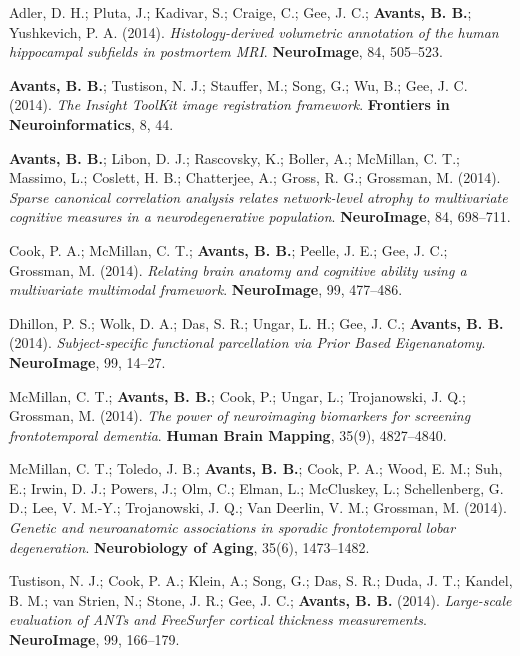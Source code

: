 \documentclass[10pt,letterpaper]{article}
\begin{document}
\begin{enumerate}
{  %
  \item Adler, D. H.; Pluta, J.; Kadivar, S.; Craige, C.; Gee, J. C.; \textbf{Avants, B. B.}; Yushkevich, P. A. (2014). \textit{Histology-derived volumetric annotation of the human hippocampal subfields in postmortem MRI}. \textbf{NeuroImage}, 84, 505--523.
  \item \textbf{Avants, B. B.}; Tustison, N. J.; Stauffer, M.; Song, G.; Wu, B.; Gee, J. C. (2014). \textit{The Insight ToolKit image registration framework}. \textbf{Frontiers in Neuroinformatics}, 8, 44.
  \item \textbf{Avants, B. B.}; Libon, D. J.; Rascovsky, K.; Boller, A.; McMillan, C. T.; Massimo, L.; Coslett, H. B.; Chatterjee, A.; Gross, R. G.; Grossman, M. (2014). \textit{Sparse canonical correlation analysis relates network-level atrophy to multivariate cognitive measures in a neurodegenerative population}. \textbf{NeuroImage}, 84, 698--711.
  \item Cook, P. A.; McMillan, C. T.; \textbf{Avants, B. B.}; Peelle, J. E.; Gee, J. C.; Grossman, M. (2014). \textit{Relating brain anatomy and cognitive ability using a multivariate multimodal framework}. \textbf{NeuroImage}, 99, 477--486.
  \item Dhillon, P. S.; Wolk, D. A.; Das, S. R.; Ungar, L. H.; Gee, J. C.; \textbf{Avants, B. B.} (2014). \textit{Subject-specific functional parcellation via Prior Based Eigenanatomy}. \textbf{NeuroImage}, 99, 14--27.
  \item McMillan, C. T.; \textbf{Avants, B. B.}; Cook, P.; Ungar, L.; Trojanowski, J. Q.; Grossman, M. (2014). \textit{The power of neuroimaging biomarkers for screening frontotemporal dementia}. \textbf{Human Brain Mapping}, 35(9), 4827--4840.
  \item McMillan, C. T.; Toledo, J. B.; \textbf{Avants, B. B.}; Cook, P. A.; Wood, E. M.; Suh, E.; Irwin, D. J.; Powers, J.; Olm, C.; Elman, L.; McCluskey, L.; Schellenberg, G. D.; Lee, V. M.-Y.; Trojanowski, J. Q.; Van Deerlin, V. M.; Grossman, M. (2014). \textit{Genetic and neuroanatomic associations in sporadic frontotemporal lobar degeneration}. \textbf{Neurobiology of Aging}, 35(6), 1473--1482.
  \item Tustison, N. J.; Cook, P. A.; Klein, A.; Song, G.; Das, S. R.; Duda, J. T.; Kandel, B. M.; van Strien, N.; Stone, J. R.; Gee, J. C.; \textbf{Avants, B. B.} (2014). \textit{Large-scale evaluation of ANTs and FreeSurfer cortical thickness measurements}. \textbf{NeuroImage}, 99, 166--179.

}
\end{enumerate}
\end{document}

